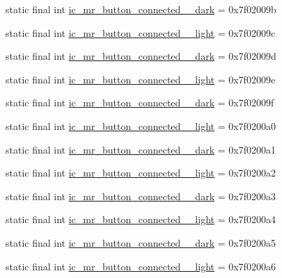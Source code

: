 \begin{CompactItemize}
static final int \hyperlink{classandroid_1_1support_1_1v7_1_1recyclerview_1_1_r_1_1drawable_3c914a6b66c784258178b496e3331cf5}{ic\_\-mr\_\-button\_\-connected\_\_\-dark} = 0x7f02009b
\item 
static final int \hyperlink{classandroid_1_1support_1_1v7_1_1recyclerview_1_1_r_1_1drawable_45781e6af9e0d47b68f9dfff0d296f65}{ic\_\-mr\_\-button\_\-connected\_\_\-light} = 0x7f02009c
\item 
static final int \hyperlink{classandroid_1_1support_1_1v7_1_1recyclerview_1_1_r_1_1drawable_70b1d2ecb7eedbfa08620eff0fe83dc8}{ic\_\-mr\_\-button\_\-connected\_\_\-dark} = 0x7f02009d
\item 
static final int \hyperlink{classandroid_1_1support_1_1v7_1_1recyclerview_1_1_r_1_1drawable_bfe79d5bed1ff62831e964bef624df1b}{ic\_\-mr\_\-button\_\-connected\_\_\-light} = 0x7f02009e
\item 
static final int \hyperlink{classandroid_1_1support_1_1v7_1_1recyclerview_1_1_r_1_1drawable_8ee5d4ad265d29f00b1159e45936484e}{ic\_\-mr\_\-button\_\-connected\_\_\-dark} = 0x7f02009f
\item 
static final int \hyperlink{classandroid_1_1support_1_1v7_1_1recyclerview_1_1_r_1_1drawable_5a6f9c9e32f65f8661c0cb1fa42476f3}{ic\_\-mr\_\-button\_\-connected\_\_\-light} = 0x7f0200a0
\item 
static final int \hyperlink{classandroid_1_1support_1_1v7_1_1recyclerview_1_1_r_1_1drawable_59f9eb067063419d968e466a29198da8}{ic\_\-mr\_\-button\_\-connected\_\_\-dark} = 0x7f0200a1
\item 
static final int \hyperlink{classandroid_1_1support_1_1v7_1_1recyclerview_1_1_r_1_1drawable_845430974cdfd3b431a3d599c45005b2}{ic\_\-mr\_\-button\_\-connected\_\_\-light} = 0x7f0200a2
\item 
static final int \hyperlink{classandroid_1_1support_1_1v7_1_1recyclerview_1_1_r_1_1drawable_357ce62babffe72100b2415ce6ca141e}{ic\_\-mr\_\-button\_\-connected\_\_\-dark} = 0x7f0200a3
\item 
static final int \hyperlink{classandroid_1_1support_1_1v7_1_1recyclerview_1_1_r_1_1drawable_5f70638f8543e3102a6ab3dd4996dcfb}{ic\_\-mr\_\-button\_\-connected\_\_\-light} = 0x7f0200a4
\item 
static final int \hyperlink{classandroid_1_1support_1_1v7_1_1recyclerview_1_1_r_1_1drawable_39569ab5083b21db061fa1085f739995}{ic\_\-mr\_\-button\_\-connected\_\_\-dark} = 0x7f0200a5
\item 
static final int \hyperlink{classandroid_1_1support_1_1v7_1_1recyclerview_1_1_r_1_1drawable_47bbebe639972fb69270a118b1112553}{ic\_\-mr\_\-button\_\-connected\_\_\-light} = 0x7f0200a6

\end{CompactItemize}
